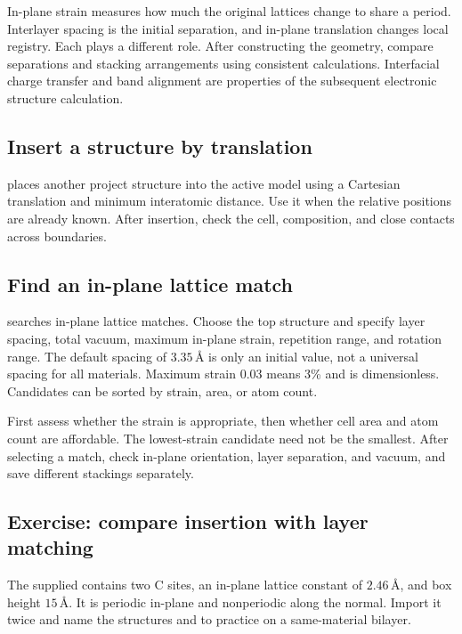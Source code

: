 In-plane strain measures how much the original lattices change to share a period. Interlayer spacing is the initial separation, and in-plane translation changes local registry. Each plays a different role. After constructing the geometry, compare separations and stacking arrangements using consistent calculations. Interfacial charge transfer and band alignment are properties of the subsequent electronic structure calculation.

\subsection{Insert a structure by translation}

 places another project structure into the active model using a Cartesian translation and minimum interatomic distance. Use it when the relative positions are already known. After insertion, check the cell, composition, and close contacts across boundaries.

\subsection{Find an in-plane lattice match}

 searches in-plane lattice matches. Choose the top structure and specify layer spacing, total vacuum, maximum in-plane strain, repetition range, and rotation range. The default spacing of $3.35\,\text{\AA}$ is only an initial value, not a universal spacing for all materials. Maximum strain 0.03 means 3\% and is dimensionless. Candidates can be sorted by strain, area, or atom count.

First assess whether the strain is appropriate, then whether cell area and atom count are affordable. The lowest-strain candidate need not be the smallest. After selecting a match, check in-plane orientation, layer separation, and vacuum, and save different stackings separately.

\subsection{Exercise: compare insertion with layer matching}

The supplied  contains two C sites, an in-plane lattice constant of $2.46\,\text{\AA}$, and box height $15\,\text{\AA}$. It is periodic in-plane and nonperiodic along the normal. Import it twice and name the structures  and  to practice on a same-material bilayer.

